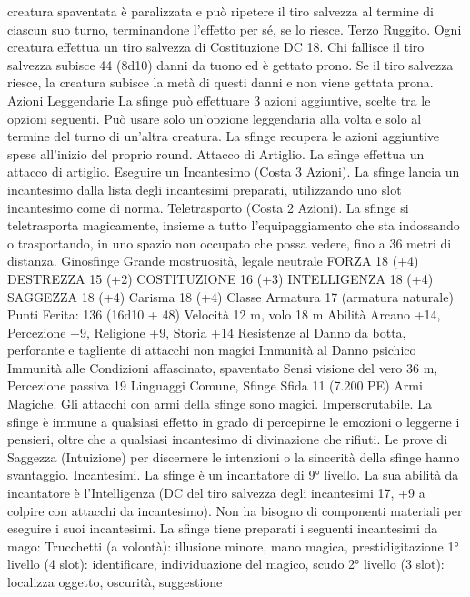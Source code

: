\begin{multicols}{2}
creatura spaventata è paralizzata e può ripetere il tiro salvezza al
termine di ciascun suo turno, terminandone l’effetto per sé, se lo
riesce.
Terzo Ruggito. Ogni creatura effettua un tiro salvezza di
Costituzione DC 18. Chi fallisce il tiro salvezza subisce 44
(8d10) danni da tuono ed è gettato prono. Se il tiro salvezza
riesce, la creatura subisce la metà di questi danni e non viene
gettata prona.
Azioni Leggendarie
La sfinge può effettuare 3 azioni aggiuntive, scelte tra le
opzioni seguenti. Può usare solo un’opzione leggendaria alla
volta e solo al termine del turno di un’altra creatura. La sfinge
recupera le azioni aggiuntive spese all’inizio del proprio round.
Attacco di Artiglio. La sfinge effettua un attacco di artiglio.
Eseguire un Incantesimo (Costa 3 Azioni). La sfinge lancia un
incantesimo dalla lista degli incantesimi preparati, utilizzando
uno slot incantesimo come di norma.
Teletrasporto (Costa 2 Azioni). La sfinge si teletrasporta
magicamente, insieme a tutto l’equipaggiamento che sta
indossando o trasportando, in uno spazio non occupato che possa
vedere, fino a 36 metri di distanza.
Ginosfinge
Grande mostruosità, legale neutrale
FORZA 18 (+4)
DESTREZZA 15 (+2)
COSTITUZIONE 16 (+3)
INTELLIGENZA 18 (+4)
SAGGEZZA 18 (+4)
Carisma 18 (+4)
Classe Armatura 17 (armatura naturale)
\hspace*{0pt}\hfill{Punti Ferita}: 136 (16d10 + 48)
Velocità 12 m, volo 18 m
Abilità Arcano +14, Percezione +9, Religione +9, Storia +14
Resistenze al Danno da botta, perforante e tagliente di
attacchi non magici
Immunità al Danno psichico
Immunità alle Condizioni affascinato, spaventato
Sensi visione del vero 36 m, Percezione passiva 19
Linguaggi Comune, Sfinge
Sfida 11 (7.200 PE)
Armi Magiche. Gli attacchi con armi della sfinge sono magici.
Imperscrutabile. La sfinge è immune a qualsiasi effetto in grado
di percepirne le emozioni o leggerne i pensieri, oltre che a
qualsiasi incantesimo di divinazione che rifiuti. Le prove di
Saggezza (Intuizione) per discernere le intenzioni o la sincerità
della sfinge hanno svantaggio.
Incantesimi. La sfinge è un incantatore di 9° livello. La sua
abilità da incantatore è l’Intelligenza (DC del tiro salvezza degli
incantesimi 17, +9 a colpire con attacchi da incantesimo). Non ha
bisogno di componenti materiali per eseguire i suoi incantesimi.
La sfinge tiene preparati i seguenti incantesimi da mago:
Trucchetti (a volontà): illusione minore, mano magica,
prestidigitazione
1° livello (4 slot): identificare, individuazione del magico, scudo
2° livello (3 slot): localizza oggetto, oscurità, suggestione

\end{multicols}
